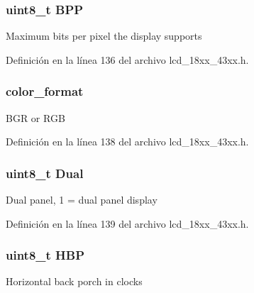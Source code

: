 \subsubsection[{\texorpdfstring{B\+PP}{BPP}}]{\setlength{\rightskip}{0pt plus 5cm}uint8\+\_\+t B\+PP}\hypertarget{struct_l_c_d___c_o_n_f_i_g___t_a1bf122d4f2dbe04ec8a49156b2160237}{}\label{struct_l_c_d___c_o_n_f_i_g___t_a1bf122d4f2dbe04ec8a49156b2160237}
Maximum bits per pixel the display supports 

Definición en la línea 136 del archivo lcd\+\_\+18xx\+\_\+43xx.\+h.

\subsubsection[{\texorpdfstring{color\+\_\+format}{color_format}}]{ color\+\_\+format}\hypertarget{struct_l_c_d___c_o_n_f_i_g___t_aadb2e5039095d6abbaf48223bce5b85c}{}\label{struct_l_c_d___c_o_n_f_i_g___t_aadb2e5039095d6abbaf48223bce5b85c}
B\+GR or R\+GB 

Definición en la línea 138 del archivo lcd\+\_\+18xx\+\_\+43xx.\+h.

\subsubsection[{\texorpdfstring{Dual}{Dual}}]{\setlength{\rightskip}{0pt plus 5cm}uint8\+\_\+t Dual}\hypertarget{struct_l_c_d___c_o_n_f_i_g___t_a7a2b46e84c2d72ac3185e3451bfcf2eb}{}\label{struct_l_c_d___c_o_n_f_i_g___t_a7a2b46e84c2d72ac3185e3451bfcf2eb}
Dual panel, 1 = dual panel display 

Definición en la línea 139 del archivo lcd\+\_\+18xx\+\_\+43xx.\+h.

\subsubsection[{\texorpdfstring{H\+BP}{HBP}}]{\setlength{\rightskip}{0pt plus 5cm}uint8\+\_\+t H\+BP}\hypertarget{struct_l_c_d___c_o_n_f_i_g___t_a8e457c625105ebf5412f0068fa527792}{}\label{struct_l_c_d___c_o_n_f_i_g___t_a8e457c625105ebf5412f0068fa527792}
Horizontal back porch in clocks 

